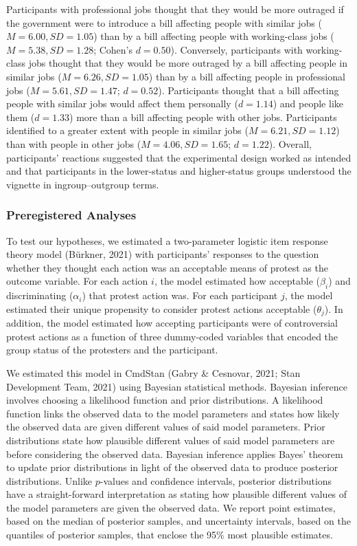 \documentclass[12pt, letterpaper]{article}
\begin{document}
Participants with professional jobs thought that they would be more
outraged if the government were to introduce a bill affecting people
with similar jobs (\(M = 6.00, SD = 1.05\)) than by a bill affecting
people with working-class jobs (\(M = 5.38, SD = 1.28\); Cohen's
\(d = 0.50\)). Conversely, participants with working-class jobs thought
that they would be more outraged by a bill affecting people in similar
jobs (\(M = 6.26, SD = 1.05\)) than by a bill affecting people in
professional jobs (\(M = 5.61, SD = 1.47\); \(d = 0.52\)). Participants
thought that a bill affecting people with similar jobs would affect them
personally (\(d = 1.14\)) and people like them (\(d = 1.33\)) more than
a bill affecting people with other jobs. Participants identified to a
greater extent with people in similar jobs (\(M = 6.21, SD = 1.12\))
than with people in other jobs (\(M = 4.06, SD = 1.65\); \(d = 1.22\)).
Overall, participants' reactions suggested that the experimental design
worked as intended and that participants in the lower-status and
higher-status groups understood the vignette in ingroup--outgroup terms.

\hypertarget{preregistered-analyses}{%
\subsubsection{Preregistered Analyses}\label{preregistered-analyses}}

To test our hypotheses, we estimated a two-parameter logistic item
response theory model (Bürkner, 2021) with participants' responses to
the question whether they thought each action was an acceptable means of
protest as the outcome variable. For each action \(i\), the model
estimated how acceptable (\(\beta_i\)) and discriminating (\(\alpha_i\))
that protest action was. For each participant \(j\), the model estimated
their unique propensity to consider protest actions acceptable
(\(\theta_j\)). In addition, the model estimated how accepting
participants were of controversial protest actions as a function of
three dummy-coded variables that encoded the group status of the
protesters and the participant.

We estimated this model in CmdStan (Gabry \& Cesnovar, 2021; Stan
Development Team, 2021) using Bayesian statistical methods. Bayesian
inference involves choosing a likelihood function and prior
distributions. A likelihood function links the observed data to the
model parameters and states how likely the observed data are given
different values of said model parameters. Prior distributions state how
plausible different values of said model parameters are before
considering the observed data. Bayesian inference applies Bayes' theorem
to update prior distributions in light of the observed data to produce
posterior distributions. Unlike \(p\)-values and confidence intervals,
posterior distributions have a straight-forward interpretation as
stating how plausible different values of the model parameters are given
the observed data. We report point estimates, based on the median of
posterior samples, and uncertainty intervals, based on the quantiles of
posterior samples, that enclose the 95\% most plausible estimates.
\end{document}
